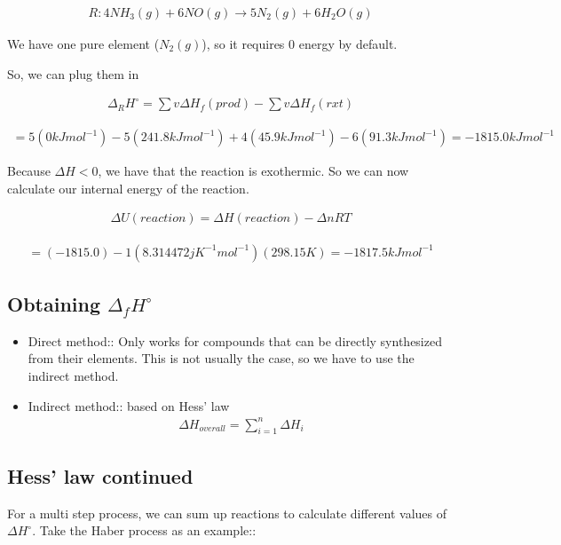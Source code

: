 \documentclass[12pt]{book}
\begin{document}
\begin{align*}
    R: 4NH_3(g)+6NO(g)\rightarrow 5N_2(g)+6H_2O(g)
\end{align*}

We have one pure element ($N_2(g)$), so it requires 0 energy by default.

So, we can plug them in

\begin{align*}
    \Delta_R H^{\circ}=\sum v\Delta H_f(prod)-\sum v\Delta H_f(rxt)
\end{align*}

\begin{align*}
    =5(0kJmol^{-1})-5(241.8kJmol^{-1})+4(45.9kJmol^{-1})-6(91.3kJmol^{-1})=-1815.0kJmol^{-1}
\end{align*}

Because $\Delta H<0$, we have that the reaction is exothermic. So we can now calculate our internal energy of the reaction.

\begin{align*}
    \Delta U(reaction)=\Delta H(reaction)-\Delta nRT
\end{align*}

\begin{align*}
    =(-1815.0)-1(8.314472jK^{-1}mol^{-1})(298.15K)=-1817.5kJmol^{-1}
\end{align*}

\subsection*{Obtaining $\Delta_f H^{\circ}$}

\begin{itemize}
    \item Direct method:: Only works for compounds that can be directly synthesized from their elements. This is not usually the case, so we have to use the indirect method.
    \item Indirect method:: based on Hess' law
    \begin{align*}
        \Delta H_{overall}=\sum_{i=1}^{n}\Delta H_i
    \end{align*}
\end{itemize}

\subsection*{Hess' law continued}

For a multi step process, we can sum up reactions to calculate different values of $\Delta H^{\circ}$. Take the Haber process as an example::
\end{document}
